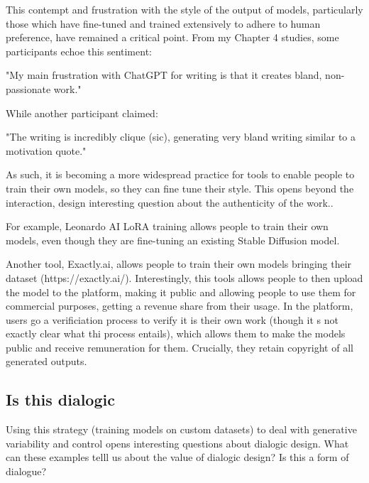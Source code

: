 This contempt and frustration with the style of the output of models, particularly those which have fine-tuned and trained extensively to adhere to human preference, have remained a critical point. From my Chapter 4 studies, some participants echoe this sentiment: 


"My main frustration with ChatGPT for writing is that it creates bland, non-passionate work."

While another participant claimed: 

"The writing is incredibly clique (sic), generating very bland writing similar to a motivation quote."


As such, it is becoming a more widespread practice for tools to enable people to train their own models, so they can fine tune their style. This opens beyond the interaction, design interesting question about the authenticity of the work.. 

For example, Leonardo AI LoRA training allows people to train their own models, even though they are fine-tuning an existing Stable Diffusion model. 

Another tool, Exactly.ai, allows people to train their own models bringing their dataset (https://exactly.ai/). Interestingly, this tools allows people to then  upload the model to the platform, making it public and allowing people to use them for commercial purposes, getting a revenue share from their usage. In the platform, users go a verificiation process to verify it is their own work (though it s not exactly clear what thi process entails), which allows them to make the models public and receive remuneration for them. Crucially, they retain copyright of all generated outputs. 



\subsection{Is this dialogic}

Using this strategy (training models on custom datasets) to deal with generative variability and control opens interesting questions about dialogic design. What can these examples telll us about the value of dialogic design? Is this a form of dialogue?

